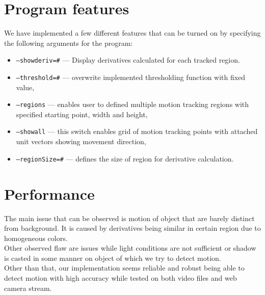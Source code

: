 \documentclass[12pt,a4paper,twocolumn]{article}
\begin{document}
\section*{Program features}
We have implemented a few different features that can be turned on by specifying the following arguments for the program:
\begin{itemize}
\item \texttt{--showderiv=\textit{\#}} --- Display derivatives calculated for each tracked region.
\item \texttt{--threshold=\textit{\#}} --- overwrite implemented thresholding function with fixed value,
\item \texttt{--regions} --- enables user to defined multiple motion tracking regions with specified starting point, width and height,
\item \texttt{--showall} --- this switch enables grid of motion tracking points with attached unit vectors showing movement direction,
\item \texttt{--regionSize=\textit{\#}} --- defines the size of region for derivative calculation.
\end{itemize}

\section*{Performance}
The main issue that can be observed is motion of object that are barely distinct from background. It is caused by derivatives being similar in certain region due to homogeneous colors.\\
Other observed flaw are issues while light conditions are not sufficient or shadow is casted in some manner on object of which we try to detect motion.\\

Other than that, our implementation seems reliable and robust being able to detect motion with high accuracy while tested on both video files and web camera stream.
\end{document}
